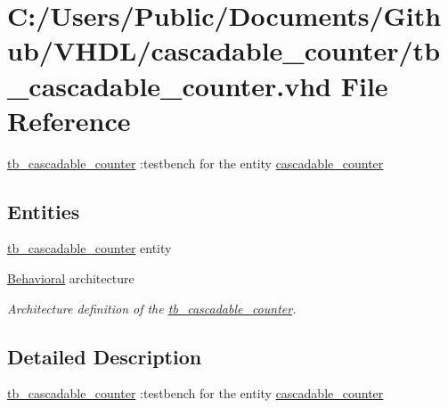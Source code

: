 \hypertarget{tb__cascadable__counter_8vhd}{}\section{C\+:/\+Users/\+Public/\+Documents/\+Github/\+V\+H\+D\+L/cascadable\+\_\+counter/tb\+\_\+cascadable\+\_\+counter.vhd File Reference}
\label{tb__cascadable__counter_8vhd}


\hyperlink{classtb__cascadable__counter}{tb\+\_\+cascadable\+\_\+counter} \+:testbench for the entity \hyperlink{classcascadable__counter}{cascadable\+\_\+counter}  


\subsection*{Entities}
\begin{DoxyCompactItemize}
\item 
\hyperlink{classtb__cascadable__counter}{tb\+\_\+cascadable\+\_\+counter} entity
\item 
\hyperlink{classtb__cascadable__counter_1_1_behavioral}{Behavioral} architecture
\begin{DoxyCompactList}\small\item\em Architecture definition of the \hyperlink{classtb__cascadable__counter}{tb\+\_\+cascadable\+\_\+counter}. \end{DoxyCompactList}\end{DoxyCompactItemize}


\subsection{Detailed Description}
\hyperlink{classtb__cascadable__counter}{tb\+\_\+cascadable\+\_\+counter} \+:testbench for the entity \hyperlink{classcascadable__counter}{cascadable\+\_\+counter} 

